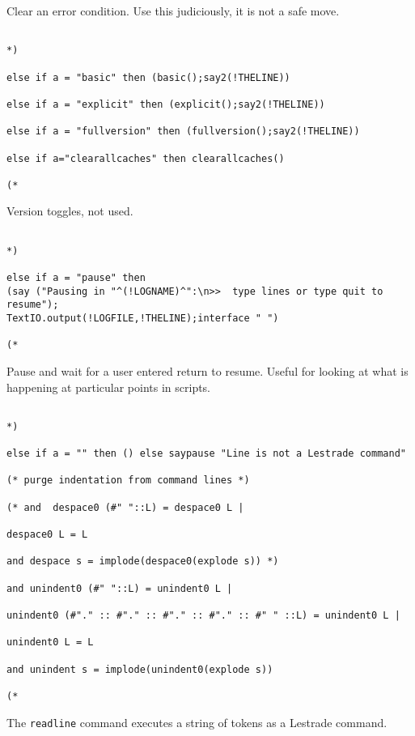 \documentclass{article}
\begin{document}
Clear an error condition.  Use this judiciously, it is not a safe move.

\begin{verbatim}

*)

else if a = "basic" then (basic();say2(!THELINE))

else if a = "explicit" then (explicit();say2(!THELINE))

else if a = "fullversion" then (fullversion();say2(!THELINE))

else if a="clearallcaches" then clearallcaches()

(*

\end{verbatim}

Version toggles, not used.

\begin{verbatim}

*)

else if a = "pause" then 
(say ("Pausing in "^(!LOGNAME)^":\n>>  type lines or type quit to resume");
TextIO.output(!LOGFILE,!THELINE);interface " ")

(*

\end{verbatim}

Pause and wait for a user entered return to resume.  Useful for looking at what is happening at particular points in scripts.

\begin{verbatim}

*)

else if a = "" then () else saypause "Line is not a Lestrade command"

(* purge indentation from command lines *)

(* and  despace0 (#" "::L) = despace0 L |

despace0 L = L

and despace s = implode(despace0(explode s)) *)

and unindent0 (#" "::L) = unindent0 L |

unindent0 (#"." :: #"." :: #"." :: #"." :: #" " ::L) = unindent0 L |

unindent0 L = L

and unindent s = implode(unindent0(explode s))

(*

\end{verbatim}

The {\tt readline} command executes a string of tokens as a Lestrade command.
\end{document}

